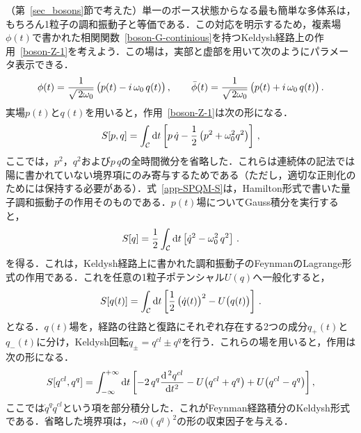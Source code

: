 \documentclass[a4paper,11pt]{ltjsarticle}
\def\d{\mathrm{d}}
\begin{document}
（第~\ref{sec_bosons}節で考えた）単一のボース状態からなる最も簡単な多体系は，もちろん1粒子の調和振動子と等価である．この対応を明示するため，複素場$\phi(t)$で書かれた相関関数~\eqref{boson-G-continious}を持つKeldysh経路上の作用~\eqref{boson-Z-1}を考えよう．この場は，実部と虚部を用いて次のようにパラメータ表示できる．
\begin{equation}\label{app-SPQM-qp}
\phi(t) = {1\over\sqrt{\,2\omega_0}}\,\big({p(t)} -i\, {\omega_0}\,
q(t)  \big)\, , \qquad \bar \phi(t) =
{1\over\sqrt{\,2\omega_0}}\,\big( {p(t)}+i\, {\omega_0}\, q(t)
\big)\, .
\end{equation}
実場$p(t)$と$q(t)$を用いると，作用~\eqref{boson-Z-1}は次の形になる．
\begin{equation}\label{app-SPQM-S}
S[p,q]=\int_{{\cal C}}\d t\left[p\,\dot q - {1\over
2}\left(p^2+\omega_0^2 q^2\right) \right]\, ,
\end{equation}
ここでは，$p^2$，$q^2$および$p\,q$の全時間微分を省略した．これらは連続体の記法では陽に書かれていない境界項にのみ寄与するためである（ただし，適切な正則化のためには保持する必要がある）．式~\eqref{app-SPQM-S}は，Hamilton形式で書いた量子調和振動子の作用そのものである．$p(t)$場についてGauss積分を実行すると，
\begin{equation}\label{app-SPQM-S-1}
S[q]={1\over 2}\int_{{\cal C}}\d t\left[ \dot q^2 -
\omega_0^2 \, q^2 \right]\, .
\end{equation}
を得る．これは，Keldysh経路上に書かれた調和振動子のFeynmanのLagrange形式の作用である．これを任意の1粒子ポテンシャル$U(q)$へ一般化すると，
\begin{equation}\label{app-SPQM-S-2}
S[q(t)]= \int_{{\cal C}}\d t\left[ {1\over 2}\,\big(\dot q(t)\big)^2
- U\big(q(t)\big) \right]\, .
\end{equation}
となる．$q(t)$場を，経路の往路と復路にそれぞれ存在する2つの成分$q_+(t)$と$q_-(t)$に分け，Keldysh回転$q_{\pm}=q^{cl}\pm
q^{q}$を行う．これらの場を用いると，作用は次の形になる．
\begin{equation}\label{app-SPQM-S-3}
S[q^{cl},q^q]=\int_{-\infty}^{+\infty}\d t\left[-2\,q^{q}{\d^{\,2}
q^{cl}\over \d t^2} - U\big(q^{cl}+q^{q}\big) + U\big(q^{cl}-
q^{q}\big) \right],
\end{equation}
ここでは$\dot
q^{q}\dot q^{cl}$という項を部分積分した．これがFeynman経路積分のKeldysh形式である．省略した境界項は，$\sim i0(q^q)^2$の形の収束因子を与える．
\end{document}
